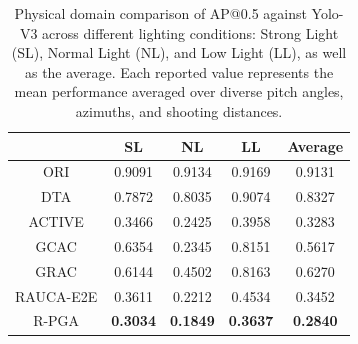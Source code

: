 \begin{table}[]
\caption{Physical domain comparison of AP@0.5 against Yolo-V3 across different lighting conditions: Strong Light (SL), Normal Light (NL), and Low Light (LL), as well as the average. Each reported value represents the mean performance averaged over diverse pitch angles, azimuths, and shooting distances.}
\centering
\vspace{2mm}
\begin{tabular}{@{}c|ccc|c@{}}
\toprule
          & SL              & NL              & LL              & Average         \\ \midrule
ORI       & 0.9091          & 0.9134          & 0.9169          & 0.9131          \\
DTA       & 0.7872          & 0.8035          & 0.9074          & 0.8327          \\
ACTIVE    & 0.3466          & 0.2425          & 0.3958          & 0.3283          \\
GCAC      & 0.6354          & 0.2345          & 0.8151          & 0.5617          \\
GRAC      & 0.6144          & 0.4502          & 0.8163          & 0.6270          \\
RAUCA-E2E & 0.3611          & 0.2212          & 0.4534          & 0.3452          \\
R-PGA     & \textbf{0.3034} & \textbf{0.1849} & \textbf{0.3637} & \textbf{0.2840} \\ \bottomrule
\end{tabular}
\label{tab:phy}

\end{table}